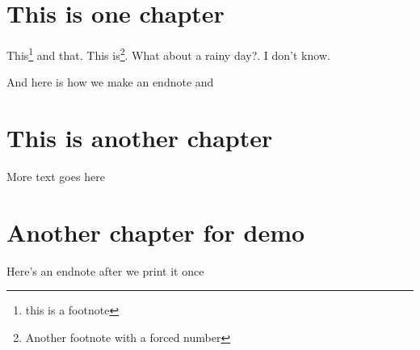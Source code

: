 \documentclass[12pt]{report}
\begin{document}
\chapter{This is one chapter}
This\footnote{this is a footnote} and that. This is\footnote[23]{Another footnote with a forced number}. What about a rainy day?\footnotemark. I don't know. 


And here is how we make an endnote and \endnotemark 



\chapter{This is another chapter}
More text goes here
\printendnotes


\chapter{Another chapter for demo}
Here's an endnote after we print it once

\printendnotes
\end{document}

